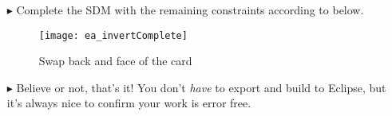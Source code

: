 \begin{itemize}
\vspace*{0.5cm}

\item[$\blacktriangleright$] Complete the SDM with the remaining constraints according to  below.

\vspace{0.5cm}

\begin{figure}[htbp]
\begin{center}
  \texttt{[image: ea\_invertComplete]}
  \caption{Swap back and face of the card}  
  \label{ea:sdm_invertComplete}
\end{center}
\end{figure}

\vspace{0.5cm}

\item[$\blacktriangleright$] Believe or not, that's it! You don't \emph{have} to export and build to Eclipse, but it's always nice to confirm your work is error
free.

\end{itemize}
